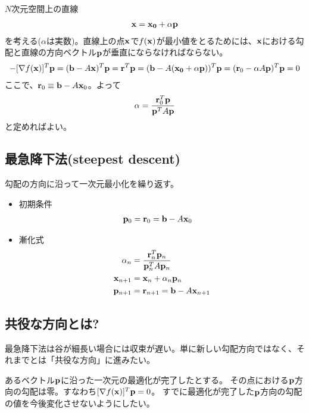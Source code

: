 \documentclass[11pt]{jarticle}
\begin{document}
$N$次元空間上の直線
\begin{align}
{\bf x} = {\bf x_0} + \alpha {\bf p}
\end{align}
を考える($\alpha$は実数)。直線上の点${\bf x}$で$f({\bf x})$が最小値をとるためには、${\bf x}$における勾配と直線の方向ベクトル${\bf p}$が垂直にならなければならない。
\begin{align}
  -[\nabla f({\bf x})]^T {\bf p} = ({\bf b} - A {\bf x})^T {\bf p} = {\bf r}^T {\bf p} = ({\bf b} - A ({\bf x_0}+\alpha {\bf p}))^T {\bf p} = ({\bf r}_0 - \alpha A {\bf p})^T {\bf p} = 0
  \label{eqn:residual}
\end{align}
ここで、${\bf r}_0 \equiv {\bf b} - A{\bf x}_0$。よって
\begin{align}
\alpha = \frac{{\bf r}_0^T {\bf p}}{{\bf p}^T A {\bf p}}
\end{align}
と定めればよい。

\subsection{最急降下法(steepest descent)}

勾配の方向に沿って一次元最小化を繰り返す。
\begin{itemize}
  \item 初期条件
\begin{align}
  {\bf p}_0 &= {\bf r}_0 = {\bf b} - A {\bf x}_0
\end{align}
  \item 漸化式
\begin{align}
  \alpha_n &= \frac{{\bf r}_n^T {\bf p}_n}{{\bf p}_n^T A {\bf p}_n} \\
  {\bf x}_{n+1} &= {\bf x}_n + \alpha_n {\bf p}_n \\
  {\bf p}_{n+1} &= {\bf r}_{n+1} = {\bf b} - A {\bf x}_{n+1}
\end{align}
\end{itemize}

\subsection{共役な方向とは?}

最急降下法は谷が細長い場合には収束が遅い。単に新しい勾配方向ではなく、それまでとは「共役な方向」に進みたい。

あるベクトル${\bf p}$に沿った一次元の最適化が完了したとする。
その点における${\bf p}$方向の勾配は零。すなわち$[\nabla f({\bf x})]^T{\bf p}=0$。
すでに最適化が完了した${\bf p}$方向の勾配の値を今後変化させないようにしたい。
\end{document}
